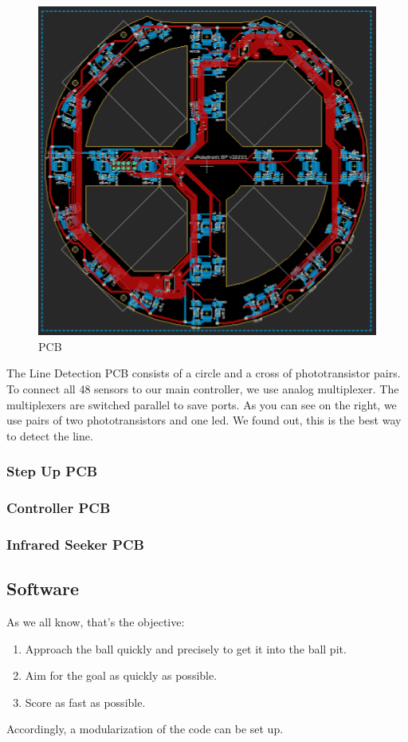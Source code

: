 \documentclass{scrartcl}
\begin{document}
\begin{figure}
    \centering
    \includegraphics[width=0.75\linewidth]{img/eagle/LineDedectionPCB.png}
    \caption{PCB}
    \label{fig:LDPCB}
\end{figure}

The Line Detection PCB consists of a circle and a cross of phototransistor pairs. To connect all
48 sensors to our main controller, we use analog multiplexer. The multiplexers are switched parallel
to save ports.
\newline
As you can see on the right, we use pairs of two phototransistors and one led. We found out, this is the 
best way to detect the line.

\subsubsection{Step Up PCB}

\subsubsection{Controller PCB}

\subsubsection{Infrared Seeker PCB}


\subsection{Software} %
As we all know, that's the objective:
\begin{enumerate}
    \item{Approach the ball quickly and precisely to get it into the ball pit.}
    \item{Aim for the goal as quickly as possible.}
    \item{Score as fast as possible.}
\end{enumerate}
Accordingly, a modularization of the code can be set up.
\end{document}
